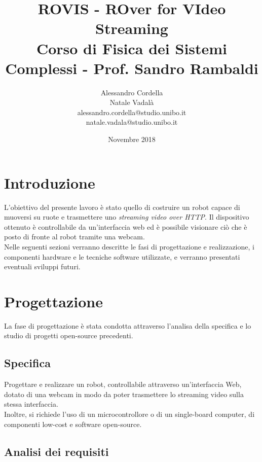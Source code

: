 \documentclass[11pt]{article}
\begin{document}
	\title{ROVIS - ROver for VIdeo Streaming\large\\Corso di Fisica dei Sistemi Complessi - Prof. Sandro Rambaldi}

	
	\author{Alessandro Cordella \\Natale Vadalà\\alessandro.cordella@studio.unibo.it\\natale.vadala@studio.unibo.it}\large
	\date{Novembre 2018}
	\maketitle
	\newpage
	\tableofcontents
	\newpage
\section{Introduzione}
L'obiettivo del presente lavoro è stato quello di costruire un robot capace di muoversi su ruote e trasmettere uno \textit{streaming video over HTTP}. Il dispositivo ottenuto è controllabile da un'interfaccia web ed è possibile visionare ciò che è posto di fronte al robot tramite una webcam.\\
Nelle seguenti sezioni verranno descritte le fasi di progettazione e realizzazione, i componenti hardware e le tecniche software utilizzate, e verranno presentati eventuali sviluppi futuri.
\section{Progettazione}
La fase di progettazione è stata condotta attraverso l'analisa della specifica e lo studio di progetti open-source precedenti.
\subsection{Specifica}
Progettare e realizzare un robot, controllabile attraverso un'interfaccia Web, dotato di una webcam in modo da poter trasmettere lo streaming video sulla stessa interfaccia.\\
Inoltre, si richiede l'uso di un microcontrollore o di un single-board computer, di componenti low-cost e software open-source.
\subsection{Analisi dei requisiti}
\end{document}
